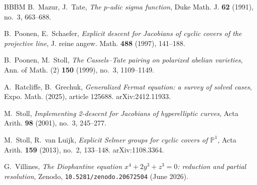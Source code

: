 \documentclass[11pt,reqno]{amsart}
\theoremstyle{plain}
\theoremstyle{definition}
\newcommand{\PP}{\mathbb{P}}
\numberwithin{equation}{section}
\begin{document}
\begin{thebibliography}{BBBM}
B.~Mazur, J.~Tate,
\emph{The $p$-adic sigma function},
Duke Math. J. \textbf{62} (1991), no.~3, 663--688.

B.~Poonen, E.~Schaefer,
\emph{Explicit descent for Jacobians of cyclic covers of the projective line},
J. reine angew. Math. \textbf{488} (1997), 141--188.

B.~Poonen, M.~Stoll,
\emph{The Cassels--Tate pairing on polarized abelian varieties},
Ann. of Math. (2) \textbf{150} (1999), no.~3, 1109--1149.

A.~Ratcliffe, B.~Grechuk,
\emph{Generalized Fermat equation: a survey of solved cases},
Expo. Math. (2025), article 125688. arXiv:2412.11933.

M.~Stoll,
\emph{Implementing 2-descent for Jacobians of hyperelliptic curves},
Acta Arith. \textbf{98} (2001), no.~3, 245--277.

M.~Stoll, R.~van Luijk,
\emph{Explicit Selmer groups for cyclic covers of $\PP^{1}$},
Acta Arith. \textbf{159} (2013), no.~2, 133--148. arXiv:1108.3364.

G.~Villines,
\emph{The Diophantine equation $x^{4}+2y^{3}+z^{3}=0$: reduction and partial
resolution}, Zenodo, \texttt{10.5281/zenodo.20672504} (June 2026).

\end{thebibliography}
\end{document}
